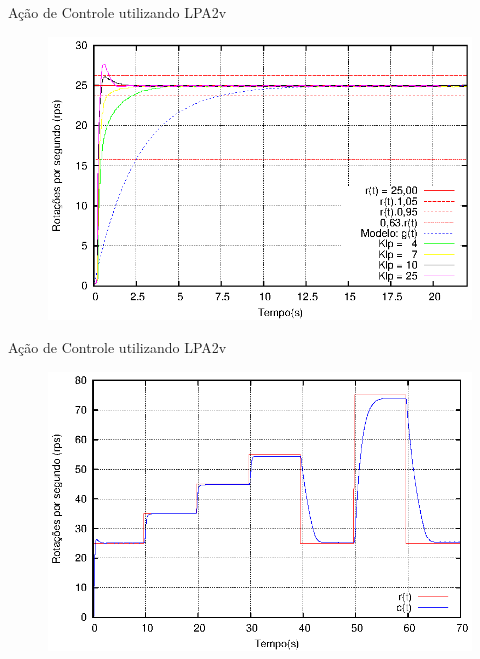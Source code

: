 \begin{frame}{Ação de Controle utilizando LPA2v}

\begin{figure}[!htb]
\vspace{-1cm}\center\includegraphics[scale=1.0]{./imagens/klpAll.eps}
\label{fig:acaoLPA2v}

\end{figure}


\end{frame}



\begin{frame}{Ação de Controle utilizando LPA2v}


\begin{figure}[!htb]
\vspace{-1cm}
\center\includegraphics[scale=1.0]{./imagens/patam85.eps}
\label{fig:acaoLPA2vpatam85}

\end{figure}

\end{frame}

